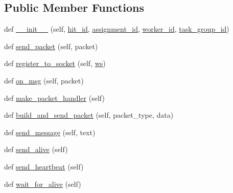 \subsection*{Public Member Functions}
\begin{DoxyCompactItemize}
\item 
def \hyperlink{classparlai_1_1mturk_1_1core_1_1legacy__2018_1_1test_1_1test__full__system_1_1MockAgent_a43e345d7f00632635a5a8f782feda7ba}{\+\_\+\+\_\+init\+\_\+\+\_\+} (self, \hyperlink{classparlai_1_1mturk_1_1core_1_1legacy__2018_1_1test_1_1test__full__system_1_1MockAgent_a429574ef8f722b7cc3442f0ecbdc3118}{hit\+\_\+id}, \hyperlink{classparlai_1_1mturk_1_1core_1_1legacy__2018_1_1test_1_1test__full__system_1_1MockAgent_a0ad9d2712a69a8bd6a19025054eb872e}{assignment\+\_\+id}, \hyperlink{classparlai_1_1mturk_1_1core_1_1legacy__2018_1_1test_1_1test__full__system_1_1MockAgent_aa5c1a0dbbef357bf40b786771975e704}{worker\+\_\+id}, \hyperlink{classparlai_1_1mturk_1_1core_1_1legacy__2018_1_1test_1_1test__full__system_1_1MockAgent_adda2b8b565971eabd7c3894128d41b3b}{task\+\_\+group\+\_\+id})
\item 
def \hyperlink{classparlai_1_1mturk_1_1core_1_1legacy__2018_1_1test_1_1test__full__system_1_1MockAgent_a0774b6b93a6ceec37e5d1d910c222f84}{send\+\_\+packet} (self, packet)
\item 
def \hyperlink{classparlai_1_1mturk_1_1core_1_1legacy__2018_1_1test_1_1test__full__system_1_1MockAgent_ad7789e7557ac736ec45b43854c998d57}{register\+\_\+to\+\_\+socket} (self, \hyperlink{classparlai_1_1mturk_1_1core_1_1legacy__2018_1_1test_1_1test__full__system_1_1MockAgent_a25cd663570eb65e4a064a8fa851bd294}{ws})
\item 
def \hyperlink{classparlai_1_1mturk_1_1core_1_1legacy__2018_1_1test_1_1test__full__system_1_1MockAgent_a281a8c558ec06f7a8ea1244a473b8b0b}{on\+\_\+msg} (self, packet)
\item 
def \hyperlink{classparlai_1_1mturk_1_1core_1_1legacy__2018_1_1test_1_1test__full__system_1_1MockAgent_a85d55e9838b31689c8bba73150d046b0}{make\+\_\+packet\+\_\+handler} (self)
\item 
def \hyperlink{classparlai_1_1mturk_1_1core_1_1legacy__2018_1_1test_1_1test__full__system_1_1MockAgent_a70db268b46d8495b81f2640e53bab891}{build\+\_\+and\+\_\+send\+\_\+packet} (self, packet\+\_\+type, data)
\item 
def \hyperlink{classparlai_1_1mturk_1_1core_1_1legacy__2018_1_1test_1_1test__full__system_1_1MockAgent_aceba268d9ab171f424784262542bbd0d}{send\+\_\+message} (self, text)
\item 
def \hyperlink{classparlai_1_1mturk_1_1core_1_1legacy__2018_1_1test_1_1test__full__system_1_1MockAgent_a1a84afaf7c65ab9bb7cca87ec1a82f7b}{send\+\_\+alive} (self)
\item 
def \hyperlink{classparlai_1_1mturk_1_1core_1_1legacy__2018_1_1test_1_1test__full__system_1_1MockAgent_a0904ec2ad3dd0c639ea2db5ecb8c0ac6}{send\+\_\+heartbeat} (self)
\item 
def \hyperlink{classparlai_1_1mturk_1_1core_1_1legacy__2018_1_1test_1_1test__full__system_1_1MockAgent_a7a7a7110be3ed9726d8185f6ddb7cdef}{wait\+\_\+for\+\_\+alive} (self)
\end{DoxyCompactItemize}
